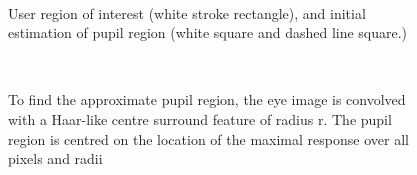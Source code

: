 \documentclass[12pt,fleqn]{book} %
\begin{document}
\begin{figure}[]
\begin{dBox}
\centering
  \mbox{
   }
   \caption{ User region of interest (white stroke rectangle), and initial estimation of pupil region (white square and dashed line square.)
 \label{fig:Pupil Region} }   
\end{dBox}   
\end{figure}


\begin{figure}[]
\begin{dBox}
\centering
  \mbox{
   }
   \caption{ To find the approximate pupil region, the eye image is convolved with a Haar-like centre surround feature of radius r. The pupil region is centred on the location of the maximal response over all pixels and radii
 \label{fig:EstimationPupilFig} }   
\end{dBox}   
\end{figure}
\end{document}
